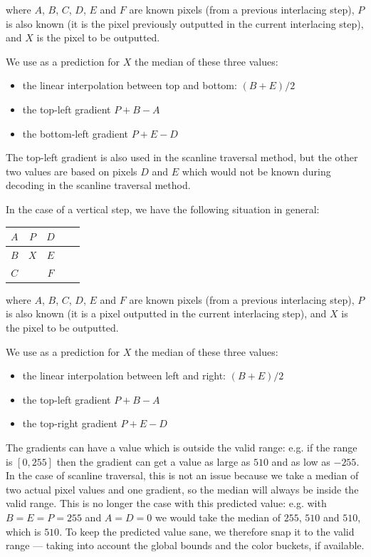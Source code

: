 \documentclass[a4paper,USenglish]{lipics}
\begin{document}
where $A$, $B$, $C$, $D$, $E$ and $F$ are known pixels (from a previous interlacing step), $P$ is also known
(it is the pixel previously outputted in the current interlacing step), and $X$ is
the pixel to be outputted.

We use as a prediction for $X$ the median of these three values:
\begin{itemize}
\item the linear interpolation between top and bottom: $(B+E)/2$
\item the top-left gradient $P+B-A$
\item the bottom-left gradient $P+E-D$
\end{itemize}
The top-left gradient is also used in the scanline traversal method, but the other two values are based on pixels $D$ and $E$ which
would not be known during decoding in the scanline traversal method.

In the case of a vertical step, we have the following situation in general:

\begin{center}
\begin{tabular}{|c|c|c|c|c|}
\hline
$A$ & $P$ & $D$ \\
\hline
$B$ & $X$ & $E$ \\
\hline
$C$ &     & $F$ \\
\hline
\end{tabular}
\end{center}

where $A$, $B$, $C$, $D$, $E$ and $F$ are known pixels (from a previous interlacing step), $P$ is also known
(it is a pixel outputted in the current interlacing step), and $X$ is
the pixel to be outputted.

We use as a prediction for $X$ the median of these three values:
\begin{itemize}
\item the linear interpolation between left and right: $(B+E)/2$
\item the top-left gradient $P+B-A$
\item the top-right gradient $P+E-D$
\end{itemize}


The gradients can have a value which is outside the valid range:
e.g. if the range is $[0,255]$ then the gradient can get a value as large as $510$ and as low as $-255$.
In the case of scanline traversal, this is not an issue because we take a median of two actual pixel values and
one gradient, so the median will always be inside the valid range. This is no longer the case with this predicted value:
e.g. with $B=E=P=255$ and $A=D=0$ we would take the median of $255$, $510$ and $510$, which is $510$.
To keep the predicted value sane, we therefore snap it to the valid range --- taking into account the global bounds
and the color buckets, if available.
\end{document}
